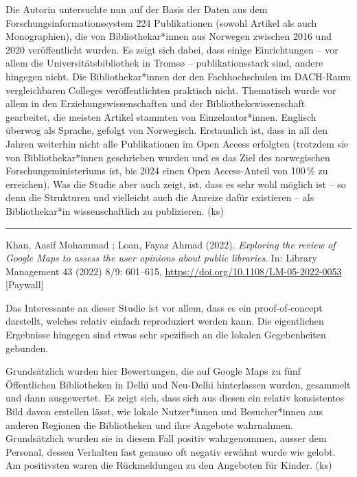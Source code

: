 \documentclass[a4paper,
fontsize=11pt,
oneside,
numbers=noperiodatend,
parskip=half-,
bibliography=totoc,
final
]{scrartcl}
\begin{document}
Die Autorin untersuchte nun auf der Basis der Daten aus dem
Forschungsinformationssystem 224 Publikationen (sowohl Artikel als auch
Monographien), die von Bibliothekar*innen aus Norwegen zwischen 2016 und
2020 veröffentlicht wurden. Es zeigt sich dabei, dass einige
Einrichtungen -- vor allem die Universitätsbibliothek in Tromsø --
publikationsstark sind, andere hingegen nicht. Die Bibliothekar*innen
der den Fachhochschulen im DACH-Raum vergleichbaren Colleges
veröffentlichten praktisch nicht. Thematisch wurde vor allem in den
Erziehungswissenschaften und der Bibliothekswissenschaft gearbeitet, die
meisten Artikel stammten von Einzelautor*innen. Englisch überwog als
Sprache, gefolgt von Norwegisch. Erstaunlich ist, dass in all den Jahren
weiterhin nicht alle Publikationen im Open Access erfolgten (trotzdem
sie von Bibliothekar*innen geschrieben wurden und es das Ziel des
norwegischen Forschungsministeriums ist, bis 2024 einen Open
Access-Anteil von 100\,\% zu erreichen). Was die Studie aber auch zeigt,
ist, dass es sehr wohl möglich ist -- so denn die Strukturen und
vielleicht auch die Anreize dafür existieren -- als Bibliothekar*in
wissenschaftlich zu publizieren. (ks)

\begin{center}\rule{0.5\linewidth}{0.5pt}\end{center}

Khan, Aasif Mohammad ; Loan, Fayaz Ahmad (2022). \emph{Exploring the
review of Google Maps to assess the user opinions about public
libraries}. In: Library Management 43 (2022) 8/9: 601--615,
\url{https://doi.org/10.1108/LM-05-2022-0053} {[}Paywall{]}

Das Interessante an dieser Studie ist vor allem, dass es ein
proof-of-concept darstellt, welches relativ einfach reproduziert werden
kann. Die eigentlichen Ergebnisse hingegen sind etwas sehr spezifisch an
die lokalen Gegebenheiten gebunden.

Grundsätzlich wurden hier Bewertungen, die auf Google Maps zu fünf
Öffentlichen Bibliotheken in Delhi und Neu-Delhi hinterlassen wurden,
gesammelt und dann ausgewertet. Es zeigt sich, dass sich aus diesen ein
relativ konsistentes Bild davon erstellen lässt, wie lokale Nutzer*innen
und Besucher*innen aus anderen Regionen die Bibliotheken und ihre
Angebote wahrnahmen. Grundsätzlich wurden sie in diesem Fall positiv
wahrgenommen, ausser dem Personal, dessen Verhalten fast genauso oft
negativ erwähnt wurde wie gelobt. Am positivsten waren die Rückmeldungen
zu den Angeboten für Kinder. (ks)
\end{document}
